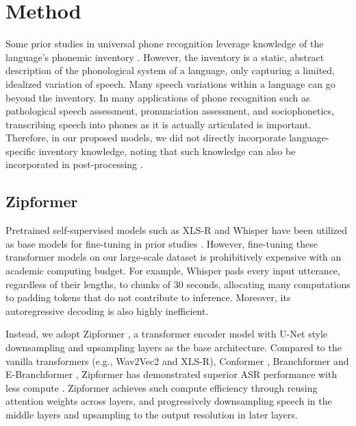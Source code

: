 \documentclass[11pt]{article}
\begin{document}
\section{Method}
Some prior studies in universal phone recognition  leverage knowledge of the language's phonemic inventory \cite{li2020universal,glocker23_interspeech}. However, the inventory is a static, abstract description of the phonological system of a language, only capturing a limited, idealized variation of speech. Many speech variations within a language can go beyond the inventory. In many applications of phone recognition such as pathological speech assessment, pronunciation assessment, and sociophonetics, transcribing speech into phones as it is actually articulated is important. Therefore, in our proposed models, we did not directly incorporate language-specific inventory knowledge, noting that such knowledge can also be incorporated in post-processing \cite{xu22b_interspeech}. 


\subsection{Zipformer}
Pretrained self-supervised models such as XLS-R \cite{babu22_interspeech} and Whisper \cite{radford2023robust} have been utilized as base models for fine-tuning in prior studies \cite{xu22b_interspeech,taguchi23_interspeech,glocker23_interspeech,samir2024efficiently}.
However, fine-tuning these transformer models on our large-scale dataset is prohibitively expensive with an academic computing budget. For example, Whisper pads every input utterance, regardless of their lengths, to chunks of 30 seconds,  allocating many computations to padding tokens that do not contribute to inference. Moreover, its autoregressive decoding is also highly inefficient.

Instead, we adopt Zipformer \citep{yao2023zipformer}, a transformer encoder model with U-Net style downsampling and upsampling layers \cite{ronneberger2015u} as the base architecture. Compared to the vanilla transformers (e.g., Wav2Vec2 and XLS-R), Conformer \cite{gulati20_interspeech}, Branchformer \cite{peng2022branchformer} and E-Branchformer \cite{kim2023branchformer}, Zipformer has demonstrated superior ASR performance with less compute \citep{yao2023zipformer}. Zipformer achieves such compute efficiency through reusing attention weights across layers, and progressively downsampling speech in the middle layers and upsampling to the output resolution in later layers. 
\end{document}
